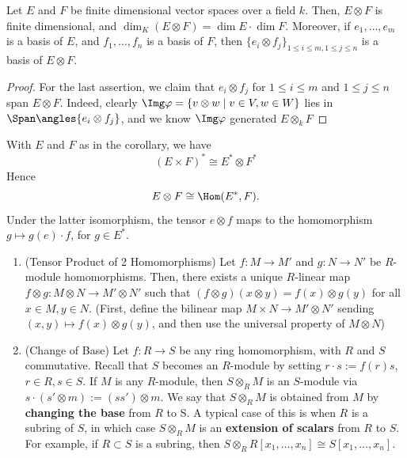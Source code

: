 \begin{cor}
    Let $E$ and $F$ be finite dimensional vector spaces over a field $k$. Then, $E \otimes F$ is finite dimensional, and $\dim_K(E \otimes F) = \dim E \cdot \dim F$. Moreover, if $e_1,\dots,e_m$ is a basis of $E$, and $f_1,\dots,f_n$ is a basis of $F$, then $\{e_i \otimes f_j\} _{1\leq i \leq m,1 \leq j \leq n}$ is a basis of $E \otimes F$.
\end{cor}

\begin{proof}
    For the last assertion, we claim that $e_i \otimes f_j$ for $1 \leq i \leq m$ and $1 \leq j \leq n$ span $E \otimes F$. Indeed, clearly $\Img \varphi = \{ v \otimes w \mid v \in V,w \in W\}$ lies in $\Span \angles{e_i \otimes f_j}$, and we know $\Img \varphi$ generated $E \otimes _kF$
\end{proof}

\begin{notebox*}[Exercise]
    With $E$ and $F$ as in the corollary, we have
    $$(E \times F)^* \cong E^* \otimes F^*$$
    Hence
    $$E \otimes F \cong \Hom(E^*,F).$$
    Under the latter isomorphism, the tensor $e \otimes f$ maps to the homomorphism $g \mapsto g(e)\cdot f$, for $g \in E^*$.
\end{notebox*}

\begin{ex}
    \begin{enumerate}
        \item (Tensor Product of 2 Homomorphisms) Let $f:M \to M'$ and $g:N \to N'$ be $R$-module homomorphisms. Then, there exists a unique $R$-linear map $f \otimes g:M \otimes N \to M ' \otimes N'$ such that $(f \otimes g)(x \otimes y) = f(x) \otimes g(y)$ for all $x \in M,y \in N$. (First, define the bilinear map $M \times N \to M' \otimes N'$ sending $(x,y) \mapsto f(x)\otimes g(y)$, and then use the universal property of $M \otimes N$)
        \item (Change of Base) Let $f : R \to S$ be any ring homomorphism, with $R$ and $S$ commutative. Recall that $S$ becomes an $R$-module by setting $r \cdot s := f(r) s$, $r \in R,s \in S$. If $M$ is any $R$-module, then $S \otimes _RM$ is an $S$-module via $s \cdot (s'\otimes m) := (ss') \otimes m$. We say that $S \otimes _RM$ is obtained from $M$ by \textbf{changing the base} from $R$ to S. A typical case of this is when $R$ is a subring of $S$, in which case $S \otimes _R M$ is an \textbf{extension of scalars} from $R$ to $S$. For example, if $R \subset S$ is a subring, then $S \otimes _R R[x_1,\dots,x_n]\cong S[x_1,\dots,x_n]$.
    \end{enumerate}
\end{ex}

